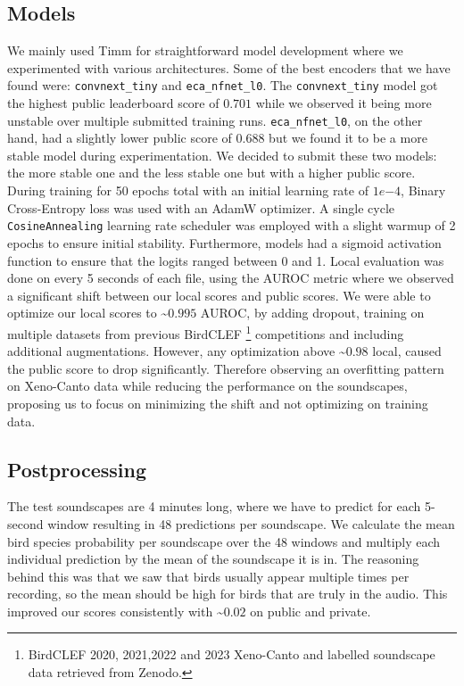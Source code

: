 \documentclass[
]{ceurart}
\begin{document}
\subsection{Models} \label{models}
We mainly used Timm \cite{timm} for straightforward model development where we experimented with various architectures. Some of the best encoders that we have found were: \texttt{convnext\_tiny} and \texttt{eca\_nfnet\_l0}. The \texttt{convnext\_tiny} model got the highest public leaderboard score of $0.701$ while we observed it being more unstable over multiple submitted training runs. \texttt{eca\_nfnet\_l0}, on the other hand, had a slightly lower public score of $0.688$ but we found it to be a more stable model during experimentation. We decided to submit these two models: the more stable one and the less stable one but with a higher public score. During training for 50 epochs total with an initial learning rate of $1e{-4}$, Binary Cross-Entropy \cite{bce} loss was used with an AdamW \cite{adam} optimizer. A single cycle \texttt{CosineAnnealing} learning rate scheduler was employed with a slight warmup of 2 epochs to ensure initial stability. Furthermore, models had a sigmoid activation function to ensure that the logits ranged between 0 and 1. Local evaluation was done on every 5 seconds of each file, using the AUROC \cite{rocauc} metric where we observed a significant shift between our local scores and public scores. We were able to optimize our local scores to \textasciitilde $0.995$ AUROC, by adding dropout, training on multiple datasets from previous BirdCLEF \footnote{BirdCLEF 2020, 2021,2022 and 2023 Xeno-Canto and labelled soundscape data retrieved from Zenodo.} competitions and including additional augmentations. However, any optimization above \textasciitilde $0.98$ local, caused the public score to drop significantly. Therefore observing an overfitting pattern on Xeno-Canto data while reducing the performance on the soundscapes, proposing us to focus on minimizing the shift and not optimizing on training data.

\subsection{Postprocessing}
The test soundscapes are 4 minutes long, where we have to predict for each 5-second window resulting in 48 predictions per soundscape. We calculate the mean bird species probability per soundscape over the 48 windows and multiply each individual prediction by the mean of the soundscape it is in. The reasoning behind this was that we saw that birds usually appear multiple times per recording, so the mean should be high for birds that are truly in the audio. This improved our scores consistently with \textasciitilde $0.02$ on public and private.
\end{document}
